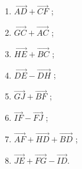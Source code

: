 \begin{exercice}
\begin{multicols}{2}[\raggedcolumns]
\begin{enumerate}%
\item $\overrightarrow{AD}+\overrightarrow{CF}$ ;
\item $\overrightarrow{GC}+\overrightarrow{AC}$ ;
\item $\overrightarrow{HE}+\overrightarrow{BC}$ ;
\item $\overrightarrow{DE}-\overrightarrow{DH}$ ;
\item $\overrightarrow{GJ}+\overrightarrow{BF}$ ;
\item $\overrightarrow{IF}-\overrightarrow{FJ}$ ;
\item $\overrightarrow{AF}+\overrightarrow{HD}+\overrightarrow{BD}$ ;
\item $\overrightarrow{JE}+\overrightarrow{FG}-\overrightarrow{ID}$.
\end{enumerate}
\end{multicols}
\end{exercice} 


